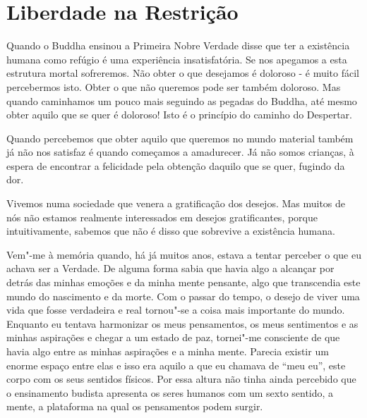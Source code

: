 \chapter{Liberdade na Restrição}

Quando o Buddha ensinou a Primeira Nobre Verdade disse que ter a
existência humana como refúgio é uma experiência insatisfatória. Se nos
apegamos a esta estrutura mortal sofreremos. Não obter o que desejamos é
doloroso - é muito fácil percebermos isto. Obter o que não queremos pode
ser também doloroso. Mas quando caminhamos um pouco mais seguindo as
pegadas do Buddha, até mesmo obter aquilo que se quer é doloroso! Isto é
o princípio do caminho do Despertar.

Quando percebemos que obter aquilo que queremos no mundo material também
já não nos satisfaz é quando começamos a amadurecer. Já não somos
crianças, à espera de encontrar a felicidade pela obtenção daquilo que
se quer, fugindo da dor.

Vivemos numa sociedade que venera a gratificação dos desejos. Mas muitos
de nós não estamos realmente interessados em desejos gratificantes,
porque intuitivamente, sabemos que não é disso que sobrevive a
existência humana.

Vem"-me à memória quando, há já muitos anos, estava a tentar perceber o
que eu achava ser a Verdade. De alguma forma sabia que havia algo a
alcançar por detrás das minhas emoções e da minha mente pensante, algo
que transcendia este mundo do nascimento e da morte. Com o passar do
tempo, o desejo de viver uma vida que fosse verdadeira e real tornou"-se
a coisa mais importante do mundo. Enquanto eu tentava harmonizar os meus
pensamentos, os meus sentimentos e as minhas aspirações e chegar a um
estado de paz, tornei"-me consciente de que havia algo entre as minhas
aspirações e a minha mente. Parecia existir um enorme espaço entre elas
e isso era aquilo a que eu chamava de ``meu eu'', este corpo com os seus
sentidos físicos. Por essa altura não tinha ainda percebido que o
ensinamento budista apresenta os seres humanos com um sexto sentido, a
mente, a plataforma na qual os pensamentos podem surgir.

